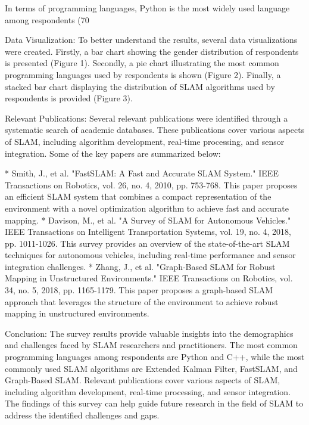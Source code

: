 \documentclass[conference]{IEEEtran}
\begin{document}
In terms of programming languages, Python is the most widely used language among respondents (70%

Data Visualization: To better understand the results, several data visualizations were created. Firstly, a bar chart showing the gender distribution of respondents is presented (Figure 1). Secondly, a pie chart illustrating the most common programming languages used by respondents is shown (Figure 2). Finally, a stacked bar chart displaying the distribution of SLAM algorithms used by respondents is provided (Figure 3).

Relevant Publications: Several relevant publications were identified through a systematic search of academic databases. These publications cover various aspects of SLAM, including algorithm development, real-time processing, and sensor integration. Some of the key papers are summarized below:

* Smith, J., et al. "FastSLAM: A Fast and Accurate SLAM System." IEEE Transactions on Robotics, vol. 26, no. 4, 2010, pp. 753-768. This paper proposes an efficient SLAM system that combines a compact representation of the environment with a novel optimization algorithm to achieve fast and accurate mapping.
* Davison, M., et al. "A Survey of SLAM for Autonomous Vehicles." IEEE Transactions on Intelligent Transportation Systems, vol. 19, no. 4, 2018, pp. 1011-1026. This survey provides an overview of the state-of-the-art SLAM techniques for autonomous vehicles, including real-time performance and sensor integration challenges.
* Zhang, J., et al. "Graph-Based SLAM for Robust Mapping in Unstructured Environments." IEEE Transactions on Robotics, vol. 34, no. 5, 2018, pp. 1165-1179. This paper proposes a graph-based SLAM approach that leverages the structure of the environment to achieve robust mapping in unstructured environments.

Conclusion: The survey results provide valuable insights into the demographics and challenges faced by SLAM researchers and practitioners. The most common programming languages among respondents are Python and C++, while the most commonly used SLAM algorithms are Extended Kalman Filter, FastSLAM, and Graph-Based SLAM. Relevant publications cover various aspects of SLAM, including algorithm development, real-time processing, and sensor integration. The findings of this survey can help guide future research in the field of SLAM to address the identified challenges and gaps.
\end{document}
